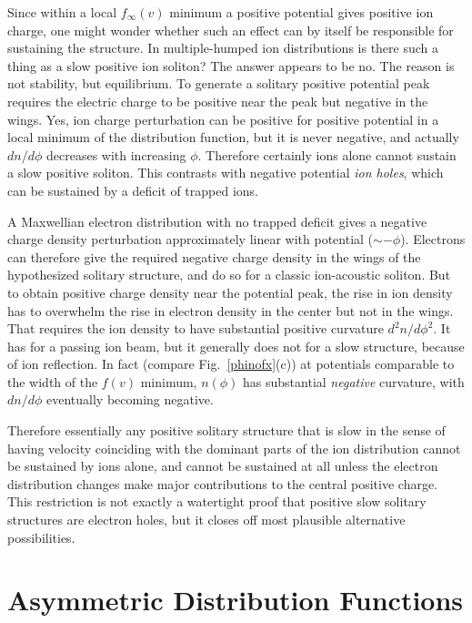 \documentclass[pre]{revtex4-2}
\begin{document}
Since within a local $f_\infty(v)$ minimum a positive potential gives
positive ion charge, one might wonder whether such an effect can by
itself be responsible for sustaining the structure. In multiple-humped
ion distributions is there such a thing as a slow positive ion
soliton?  The answer appears to be no. The reason is not stability,
but equilibrium. To generate a solitary positive potential peak
requires the electric charge to be positive near the peak but
negative in the wings. Yes, ion charge perturbation can be positive for
positive potential in a local minimum of the distribution function,
but it is never negative, and actually $dn/d\phi$ decreases with
increasing $\phi$. Therefore certainly ions alone cannot sustain a
slow positive soliton. This contrasts with negative potential
\emph{ion holes}, which can be sustained by a deficit of trapped ions.

A Maxwellian electron distribution with no trapped deficit gives a
negative charge density perturbation approximately linear with
potential ($\sim -\phi$).  Electrons can therefore give the required
negative charge density in the wings of the hypothesized solitary
structure, and do so for a classic ion-acoustic soliton. But to obtain
positive charge density near the potential peak, the rise in ion
density has to overwhelm the rise in electron density in the center
but not in the wings. That requires the ion density to have
substantial positive curvature $d^2n/d\phi^2$. It has for a passing
ion beam, but it generally does not for a slow structure, because of
ion reflection. In fact (compare Fig.\ \ref{phinofx}(c)) at potentials
comparable to the width of the $f(v)$ minimum, $n(\phi)$ has
substantial \emph{negative} curvature, with $dn/d\phi$ eventually
becoming negative.

Therefore essentially any positive solitary structure that is slow in
the sense of having velocity coinciding with the dominant parts of the
ion distribution cannot be sustained by ions alone, and cannot be
sustained at all unless the electron distribution changes make major
contributions to the central positive charge. This restriction is not
exactly a watertight proof that positive slow solitary structures are
electron holes, but it closes off most plausible alternative possibilities.


\section{Asymmetric Distribution Functions}\label{sec2}
\end{document}
